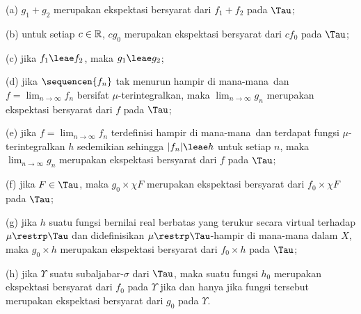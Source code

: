 (a) $g_1+g_2$ merupakan ekspektasi bersyarat dari $f_1+f_2$ pada $\Tau$;

(b) untuk setiap $c\in\Bbb R$, $cg_0$ merupakan ekspektasi bersyarat dari
$cf_0$ pada $\Tau$;

(c) jika $f_1\leae f_2$, maka $g_1\leae g_2$;

(d) jika $\sequencen{f_n}$ tak menurun hampir di mana-mana\ dan
$f=\lim_{n\to\infty}f_n$ bersifat $\mu$-terintegralkan, maka
$\lim_{n\to\infty}g_n$ merupakan ekspektasi bersyarat dari $f$ pada
$\Tau$;

(e) jika $f=\lim_{n\to\infty}f_n$ terdefinisi hampir di mana-mana\ dan
terdapat fungsi $\mu$-terintegralkan $h$ sedemikian sehingga
$|f_n|\leae h$ untuk setiap $n$, maka $\lim_{n\to\infty}g_n$ merupakan
ekspektasi bersyarat dari $f$ pada $\Tau$;

(f) jika $F\in\Tau$, maka $g_0\times \chi F$ merupakan ekspektasi
bersyarat dari $f_0\times\chi F$ pada $\Tau$;

(g) jika $h$ suatu fungsi bernilai real berbatas yang terukur secara
virtual terhadap $\mu\restrp\Tau$ dan didefinisikan
$\mu\restrp\Tau$-hampir di mana-mana dalam $X$, maka $g_0\times h$
merupakan ekspektasi bersyarat dari $f_0\times h$ pada $\Tau$;

(h) jika $\Upsilon$ suatu subaljabar-$\sigma$ dari $\Tau$, maka suatu
fungsi $h_0$ merupakan ekspektasi bersyarat dari $f_0$ pada $\Upsilon$
jika dan hanya jika fungsi tersebut merupakan ekspektasi bersyarat dari
$g_0$ pada $\Upsilon$.

